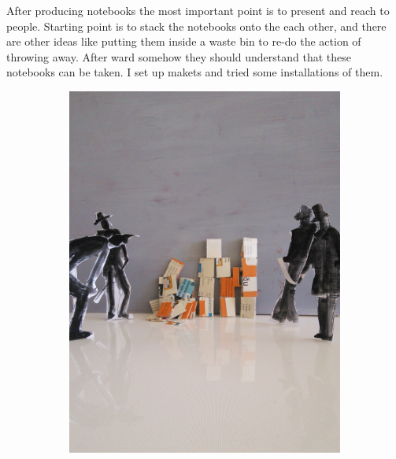 



After producing notebooks the most important point is to present and reach to people. Starting point is to stack the notebooks onto the each other, and there are other ideas like putting them inside a waste bin to re-do the action of throwing away. After ward somehow they should understand that these notebooks can be taken. I set up makets and tried some installations of them.

\begin{figure}
    \centering
    \begin{subfigure}[b]{0.3\textwidth}
        \includegraphics[width=\textwidth]{project_graphics/exhibition1.jpg}
        \label{fig:exhibition1}
    \end{subfigure}
    \begin{subfigure}[b]{0.3\textwidth}

\end{subfigure}
\end{figure}
